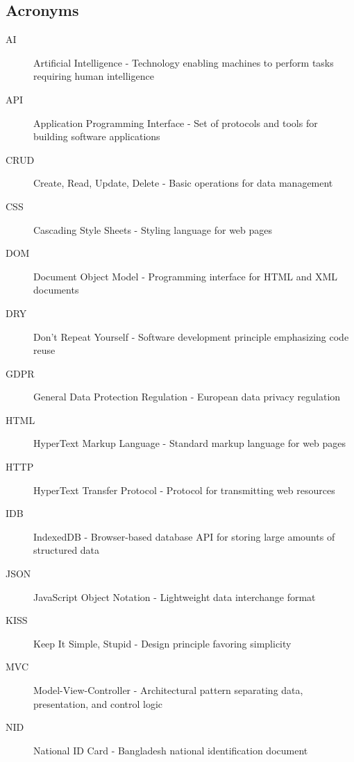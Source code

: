 \documentclass[11pt, a4paper]{article}
\theoremstyle{plain}
\theoremstyle{definition}
\begin{document}
\subsection{Acronyms}

\begin{description}
    \item[AI] Artificial Intelligence - Technology enabling machines to perform tasks requiring human intelligence
    
    \item[API] Application Programming Interface - Set of protocols and tools for building software applications
    
    \item[CRUD] Create, Read, Update, Delete - Basic operations for data management
    
    \item[CSS] Cascading Style Sheets - Styling language for web pages
    
    \item[DOM] Document Object Model - Programming interface for HTML and XML documents
    
    \item[DRY] Don't Repeat Yourself - Software development principle emphasizing code reuse
    
    \item[GDPR] General Data Protection Regulation - European data privacy regulation
    
    \item[HTML] HyperText Markup Language - Standard markup language for web pages
    
    \item[HTTP] HyperText Transfer Protocol - Protocol for transmitting web resources
    
    \item[IDB] IndexedDB - Browser-based database API for storing large amounts of structured data
    
    \item[JSON] JavaScript Object Notation - Lightweight data interchange format
    
    \item[KISS] Keep It Simple, Stupid - Design principle favoring simplicity
    
    \item[MVC] Model-View-Controller - Architectural pattern separating data, presentation, and control logic
    
    \item[NID] National ID Card - Bangladesh national identification document
    

\end{description}
\end{document}
